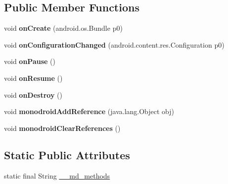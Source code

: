 \subsection*{Public Member Functions}
\begin{DoxyCompactItemize}
\item 
\mbox{\label{classmd59e336b20c5f59a4196ec0611a339f132_1_1AndroidGameActivity_a09e5869a2c9b5571ecd9845e36b21000}} 
void {\bfseries on\+Create} (android.\+os.\+Bundle p0)
\item 
\mbox{\label{classmd59e336b20c5f59a4196ec0611a339f132_1_1AndroidGameActivity_a164076906caa0208f8b5e35017344cc4}} 
void {\bfseries on\+Configuration\+Changed} (android.\+content.\+res.\+Configuration p0)
\item 
\mbox{\label{classmd59e336b20c5f59a4196ec0611a339f132_1_1AndroidGameActivity_a190487ce4105745b564ee6e3be491a5c}} 
void {\bfseries on\+Pause} ()
\item 
\mbox{\label{classmd59e336b20c5f59a4196ec0611a339f132_1_1AndroidGameActivity_af2b27b014a62b09644579ad659c2c55f}} 
void {\bfseries on\+Resume} ()
\item 
\mbox{\label{classmd59e336b20c5f59a4196ec0611a339f132_1_1AndroidGameActivity_a945a233209b083dabe97b3519d68e548}} 
void {\bfseries on\+Destroy} ()
\item 
\mbox{\label{classmd59e336b20c5f59a4196ec0611a339f132_1_1AndroidGameActivity_af5c0bf802dab7324c52bc5aa287ba202}} 
void {\bfseries monodroid\+Add\+Reference} (java.\+lang.\+Object obj)
\item 
\mbox{\label{classmd59e336b20c5f59a4196ec0611a339f132_1_1AndroidGameActivity_a254eed67507df39f1f23ddd1cc9f742c}} 
void {\bfseries monodroid\+Clear\+References} ()
\end{DoxyCompactItemize}
\subsection*{Static Public Attributes}
\begin{DoxyCompactItemize}
\item 
static final String \hyperlink{classmd59e336b20c5f59a4196ec0611a339f132_1_1AndroidGameActivity_a05f6fdbe6c70591e3f9b2d7db21c1f56}{\+\_\+\+\_\+md\+\_\+methods}
\end{DoxyCompactItemize}

